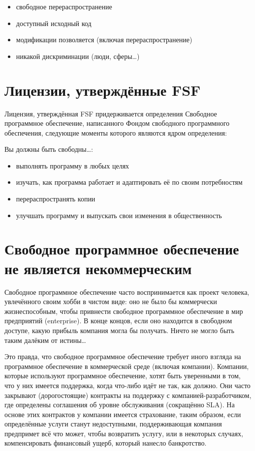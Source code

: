 \documentclass[10pt]{book}
\begin{document}
\begin{itemize}
	\item свободное перераспространение
	\item доступный исходный код
	\item модификации позволяется (включая перераспространение)
	\item никакой дискриминации (люди, сферы\ldots)
\end{itemize}

\section{Лицензии, утверждённые FSF}


\vspace{-4mm}

Лицензия, утверждённая FSF придерживается определения Свободное программное обеспечение, написанного Фондом свободного программного обеспечения, следующие моменты которого являются ядром определения:

Вы должны быть свободны\ldots:

\begin{itemize}
	\item выполнять программу в любых целях
	\item изучать, как программа работает и адаптировать её по своим потребностям
	\item перераспространять копии
	\item улучшать программу и выпускать свои изменения в общественность
\end{itemize}

\section{Свободное программное обеспечение не является некоммерческим}

Свободное программное обеспечение часто воспринимается как проект человека, увлечённого своим хобби в чистом виде: оно не было бы коммерчески жизнеспособным, чтобы привнести свободное программное обеспечение в мир предприятий (enterprise). В конце концов, если оно находится в свободном доступе, какую прибыль компания могла бы получать. Ничто не могло быть таким далёким от истины\ldots

Это правда, что свободное программное обеспечение требует иного взгляда на программное обеспечение в коммерческой среде (включая компании). Компании, которые используют программное обеспечение, хотят быть уверенными в том, что у них имеется поддержка, когда что-либо идёт не так, как должно. Они часто закрывают (дорогостоящие) контракты на поддержку с компанией-разработ\-чиком, где определены соглашения об уровне обслуживания (сокращённо SLA). На основе этих контрактов у компании имеется страхование, таким образом, если определённые услуги станут недоступными, поддерживающая компания предпримет всё что может, чтобы возвратить услугу, или в некоторых случаях, компенсировать финансовый ущерб, который нанесло банкротство.
\end{document}
